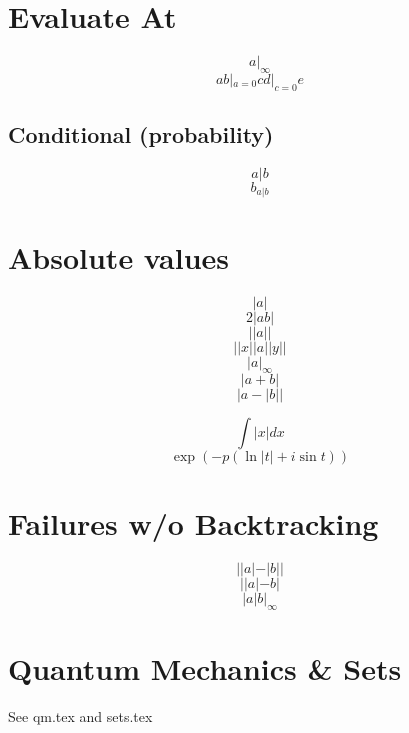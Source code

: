 \documentclass{article}
\begin{document}
%
%
%
%
%
%

\section{Evaluate At}
\[  a |_\infty \]
\[ a b |_{a=0} c d |_{c=0} e \]

\subsection{Conditional (probability)}
\[ a|b \]
\[ b_{a|b} \]

\section{Absolute values}
\[  |a| \]
\[ 2|ab| \] %
\[ ||a|| \]
\[ || x || a || y || \] %
\[  |a |_\infty \]
\[  |a + b| \]
\[  |a - |b|| \]

\[ \int |x| dx \]
\[ \exp (-p(\ln|t|+i\sin t)) \]

\section{Failures w/o Backtracking}
\[  ||a| - |b|| \]
\[ ||a|-b| \]
\[  |a | b |_\infty \]

\section{Quantum Mechanics \& Sets}
See qm.tex and sets.tex
\end{document}
